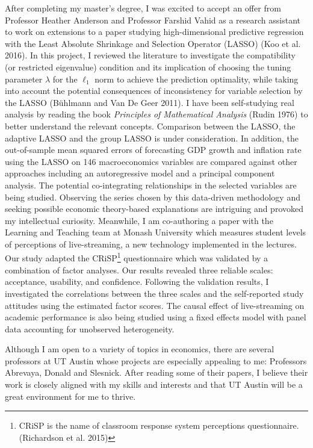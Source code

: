 \documentclass[12pt,]{article}
\let\rmarkdownfootnote\footnote%
\def\footnote{\protect\rmarkdownfootnote}
\begin{document}
After completing my master's degree, I was excited to accept an offer
from Professor Heather Anderson and Professor Farshid Vahid as a
research assistant to work on extensions to a paper studying
high-dimensional predictive regression with the Least Absolute Shrinkage
and Selection Operator (LASSO) (Koo et al. 2016). In this project, I
reviewed the literature to investigate the compatibility (or restricted
eigenvalue) condition and its implication of choosing the tuning
parameter \(\lambda\) for the \(\ell_1\) norm to achieve the prediction
optimality, while taking into account the potential consequences of
inconsistency for variable selection by the LASSO (Bühlmann and Van De
Geer 2011). I have been self-studying real analysis by reading the book
\emph{Principles of Mathematical Analysis} (Rudin 1976) to better
understand the relevant concepts. Comparison between the LASSO, the
adaptive LASSO and the group LASSO is under consideration. In addition,
the out-of-sample mean squared errors of forecasting GDP growth and
inflation rate using the LASSO on 146 macroeconomics variables are
compared against other approaches including an autoregressive model and
a principal component analysis. The potential co-integrating
relationships in the selected variables are being studied. Observing the
series chosen by this data-driven methodology and seeking possible
economic theory-based explanations are intriguing and provoked my
intellectual curiosity. Meanwhile, I am co-authoring a paper with the
Learning and Teaching team at Monash University which measures student
levels of perceptions of live-streaming, a new technology implemented in
the lectures. Our study adapted the CRiSP\footnote{CRiSP is the name of
  classroom response system perceptions questionnaire. (Richardson et
  al. 2015)} questionnaire which was validated by a combination of
factor analyses. Our results revealed three reliable scales: acceptance,
usability, and confidence. Following the validation results, I
investigated the correlations between the three scales and the
self-reported study attitudes using the estimated factor scores. The
causal effect of live-streaming on academic performance is also being
studied using a fixed effects model with panel data accounting for
unobserved heterogeneity.

Although I am open to a variety of topics in economics, there are
several professors at UT Austin whose projects are especially appealing
to me: Professors Abrevaya, Donald and Slesnick. After reading some of
their papers, I believe their work is closely aligned with my skills and
interests and that UT Austin will be a great environment for me to
thrive.
\end{document}
